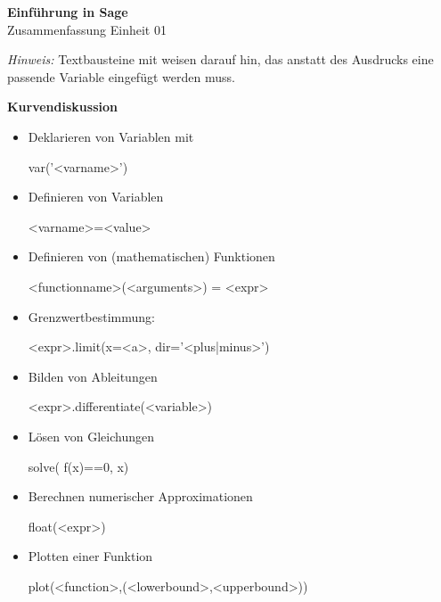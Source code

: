 \documentclass[a4paper,9pt,DIV15,twocolumn]{scrartcl}
\begin{document}
\begin{center}
    \textbf{\LARGE Einf\"uhrung in Sage}\\
    {\large Zusammenfassung Einheit 01}
\end{center}
\textsl{Hinweis:} Textbausteine mit  weisen darauf hin, das anstatt des Ausdrucks eine passende Variable eingefügt werden muss.

\medskip
\textbf{Kurvendiskussion}
\begin{itemize}
 \item Deklarieren von Variablen mit 
\begin{sagein}
var('<varname>')
\end{sagein}
\item Definieren von Variablen 
    \begin{sagein}
<varname>=<value>        
    \end{sagein}
\item Definieren von (mathematischen) Funktionen 
    \begin{sagein}
<functionname>(<arguments>) = <expr>
    \end{sagein}
\item Grenzwertbestimmung:
    \begin{sagein}
<expr>.limit(x=<a>, dir='<plus|minus>')
    \end{sagein}
\item Bilden von Ableitungen
\begin{sagein}
<expr>.differentiate(<variable>)
\end{sagein}

\item Lösen von Gleichungen
\begin{sagein}
solve( f(x)==0, x)
\end{sagein}

\item Berechnen numerischer Approximationen
\begin{sagein}
float(<expr>)
\end{sagein}
\item Plotten einer Funktion 
\begin{sagein}
plot(<function>,(<lowerbound>,<upperbound>))
\end{sagein}
\end{itemize}
\end{document}
